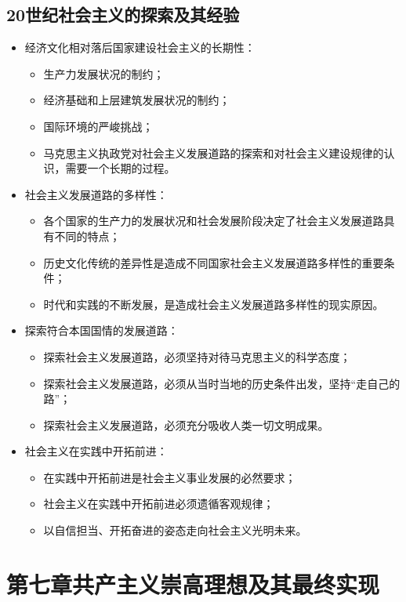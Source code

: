 \documentclass[12pt,openany]{ctexbook}
\begin{document}
\section{20世纪社会主义的探索及其经验}
\begin{itemize}
  \item 经济文化相对落后国家建设社会主义的长期性：
\begin{itemize}
  \item 生产力发展状况的制约；
  \item 经济基础和上层建筑发展状况的制约；
  \item 国际环境的严峻挑战；
  \item 马克思主义执政党对社会主义发展道路的探索和对社会主义建设规律的认识，需要一个长期的过程。
\end{itemize}
  \item 社会主义发展道路的多样性：
\begin{itemize}
  \item 各个国家的生产力的发展状况和社会发展阶段决定了社会主义发展道路具有不同的特点；
  \item 历史文化传统的差异性是造成不同国家社会主义发展道路多样性的重要条件；
  \item 时代和实践的不断发展，是造成社会主义发展道路多样性的现实原因。
\end{itemize}
  \item 探索符合本国国情的发展道路：
\begin{itemize}
  \item 探索社会主义发展道路，必须坚持对待马克思主义的科学态度；
  \item 探索社会主义发展道路，必须从当时当地的历史条件出发，坚持“走自己的路”；
  \item 探索社会主义发展道路，必须充分吸收人类一切文明成果。
\end{itemize}
  \item 社会主义在实践中开拓前进：
\begin{itemize}
  \item 在实践中开拓前进是社会主义事业发展的必然要求；
  \item 社会主义在实践中开拓前进必须遗循客观规律；
  \item 以自信担当、开拓奋进的姿态走向社会主义光明未来。
\end{itemize}
\end{itemize}
\chapter{第七章\quad{}共产主义崇高理想及其最终实现}
\end{document}
